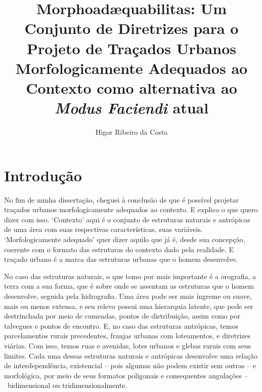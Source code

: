 \documentclass[]{report}
\title{\textbf{Morphoadæquabilitas}: Um Conjunto de Diretrizes para o Projeto de Traçados Urbanos Morfologicamente Adequados ao Contexto como alternativa ao \textit{Modus Faciendi} atual}
\author{Higor Ribeiro da Costa}
\begin{document}
\maketitle

\tableofcontents

\begin{abstract}
\end{abstract}

	\chapter*{Introdução}
	\onehalfspacing

	No fim de minha dissertação, cheguei à conclusão de que é possível projetar traçados urbanos morfologicamente adequados ao contexto. E explico o que quero dizer com isso. `Contexto' aqui é o conjunto de estruturas naturais e antrópicas de uma área com suas respectivas características, suas variáveis. `Morfologicamente adequado' quer dizer aquilo que já é, desde sua concepção, coerente com o formato das estruturas do contexto dado pela realidade. E traçado urbano é a marca das estruturas urbanas que o homem desenvolve.
	
	No caso das estruturas naturais, o que tomo por mais importante é a orografia, a terra com a sua forma, que é sobre onde se assentam as estruturas que o homem desenvolve, seguida pela hidrografia. Uma área pode ser mais íngreme ou suave, mais ou menos extensa, e seu relevo possui uma hierarquia latente, que pode ser destrinchada por meio de cumeadas, pontos de distribuição, assim como por talvegues e pontos de encontro. E, no caso das estruturas antrópicas, temos parcelamentos rurais precedentes, franjas urbanas com loteamentos, e diretrizes viárias. Com isso, temos ruas e avenidas, lotes urbanos e glebas rurais com seus limites. Cada uma dessas estruturas naturais e antrópicas desenvolve uma relação de interdependência, existencial – pois algumas não podem existir sem outras – e morfológica, por meio de seus formatos poligonais e consequentes angulações – bidimensional ou tridimensionalmente. 
	
\end{document}
